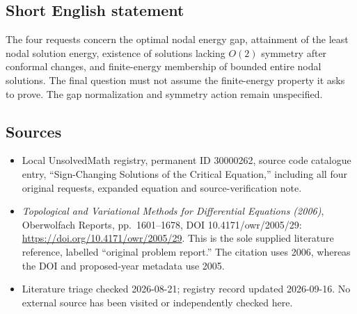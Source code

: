 \documentclass[11pt]{article}
\begin{document}
\subsection{Short English statement}
The four requests concern the optimal nodal energy gap, attainment of the least nodal solution energy, existence of solutions lacking \(O(2)\) symmetry after conformal changes, and finite-energy membership of bounded entire nodal solutions. The final question must not assume the finite-energy property it asks to prove. The gap normalization and symmetry action remain unspecified.
\subsection{Sources}
\begin{itemize}
\item Local UnsolvedMath registry, permanent ID 30000262, source code catalogue entry, ``Sign-Changing Solutions of the Critical Equation,'' including all four original requests, expanded equation and source-verification note.
\item \emph{Topological and Variational Methods for Differential Equations (2006)}, Oberwolfach Reports, pp.\ 1601--1678, DOI 10.4171/owr/2005/29: \url{https://doi.org/10.4171/owr/2005/29}. This is the sole supplied literature reference, labelled ``original problem report.'' The citation uses 2006, whereas the DOI and proposed-year metadata use 2005.
\item Literature triage checked 2026-08-21; registry record updated 2026-09-16. No external source has been visited or independently checked here.
\end{itemize}
\end{document}

